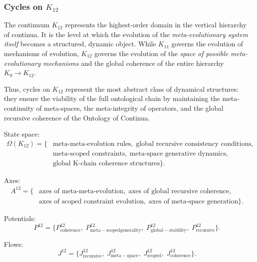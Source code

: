 
\subsubsection{Cycles on $K_{12}$}
\label{sec:cycles-k12}

The continuum $K_{12}$ represents the highest-order domain in the vertical
hierarchy of continua. It is the level at which the evolution of the
\emph{meta-evolutionary system itself} becomes a structured, dynamic object.
While $K_{11}$ governs the evolution of mechanisms of evolution, $K_{12}$
governs the evolution of the \emph{space of possible meta-evolutionary
mechanisms} and the global coherence of the entire hierarchy
$K_0 \to K_{12}$.

Thus, cycles on $K_{12}$ represent the most abstract class of dynamical
structures: they ensure the viability of the full ontological chain by
maintaining the meta-continuity of meta-spaces, the meta-integrity of
operators, and the global recursive coherence of the Ontology of Continua.

State space:
\[
  \begin{aligned}
  \Omega(K_{12})
  = \{&
     \text{meta-meta-evolution rules},\;
     \text{global recursive consistency conditions},\\
     &\text{meta-scoped constraints},\;
     \text{meta-space generative dynamics},\\
     &\text{global K-chain coherence structures}
  \}.
  \end{aligned}
\]

Axes:
\[
  \begin{aligned}
  A^{12}
  = \{&
     \text{axes of meta-meta-evolution},\;
     \text{axes of global recursive coherence},\\
     &\text{axes of scoped constraint evolution},\;
     \text{axes of meta-space generation}
  \}.
  \end{aligned}
\]

Potentials:
\[
  P^{12}
  =
  \{
     P^{12}_{\mathrm{coherence}},\;
     P^{12}_{\mathrm{meta\!-\!scoped generality}},\;
     P^{12}_{\mathrm{global\!-\!stability}},\;
     P^{12}_{\mathrm{recursive}}
  \}.
\]

Flows:
\[
  J^{12}
  =
  \{
    J^{12}_{\mathrm{recursive}},\;
    J^{12}_{\mathrm{meta\!-\!space}},\;
    J^{12}_{\mathrm{scoped}},\;
    J^{12}_{\mathrm{coherence}}
  \}.
\]

